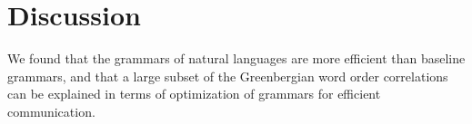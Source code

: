 \documentclass[9pt,twocolumn,twoside,lineno]{pnas-new}
\begin{document}









\section*{Discussion}

We found that the grammars of natural languages are more efficient than baseline grammars, and that a large subset of the Greenbergian word order correlations can be explained in terms of optimization of grammars for efficient communication. %
\end{document}
